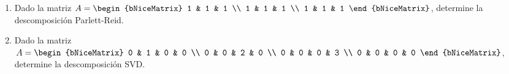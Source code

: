 \documentclass[
	spanish,
	8pt,
	utf8,
	xcolor=table,
	handout,
	aspectratio=169,
	professionalfonts,
	notheorems,
	mathserif,
]{beamer}
\newcounter{savedenum}
\newcommand*{\saveenum}{\setcounter{savedenum}{\theenumi}}
\begin{document}
\begin{frame}
\begin{enumerate}
		\item

		      Dado la matriz
		      \begin{math}
			      A=
			      \begin{bNiceMatrix}
				      1 & 1 & 1 \\
				      1 & 1 & 1 \\
				      1 & 1 & 1
			      \end{bNiceMatrix}
		      \end{math},
		      determine la descomposición Parlett-Reid.

		\item

		      Dado la matriz
		      \begin{math}
			      A=
			      \begin{bNiceMatrix}
				      0 & 1 & 0 & 0 \\
				      0 & 0 & 2 & 0 \\
				      0 & 0 & 0 & 3 \\
				      0 & 0 & 0 & 0
			      \end{bNiceMatrix}
		      \end{math},
		      determine la descomposición SVD.

		      \saveenum
	\end{enumerate}
\end{frame}
\end{document}
